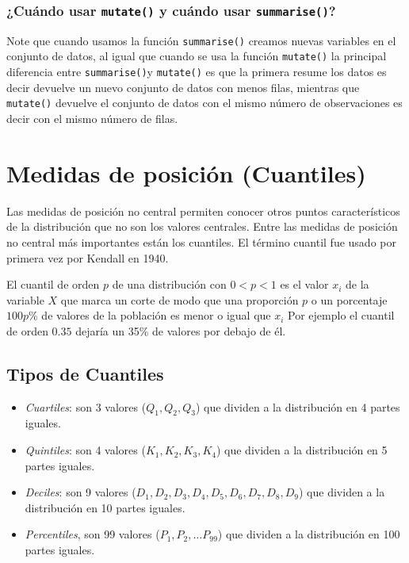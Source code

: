 \documentclass[]{book}
\begin{document}
\hypertarget{cuando-usar-mutate-y-cuando-usar-summarise}{%
\subsubsection{\texorpdfstring{¿Cuándo usar \texttt{mutate()} y cuándo usar \texttt{summarise()}?}{¿Cuándo usar mutate() y cuándo usar summarise()?}}\label{cuando-usar-mutate-y-cuando-usar-summarise}}

Note que cuando usamos la función \texttt{summarise()} creamos nuevas variables en el conjunto de datos, al igual que cuando se usa la función \texttt{mutate()} la principal diferencia entre \texttt{summarise()}y \texttt{mutate()} es que la primera resume los datos es decir devuelve un nuevo conjunto de datos con menos filas, mientras que \texttt{mutate()} devuelve el conjunto de datos con el mismo número de observaciones es decir con el mismo número de filas.

\hypertarget{medidas-de-posicion-cuantiles}{%
\section{Medidas de posición (Cuantiles)}\label{medidas-de-posicion-cuantiles}}

Las medidas de posición no central permiten conocer otros puntos característicos de la distribución que no son los valores centrales. Entre las medidas de posición no central más importantes están los cuantiles. El término cuantil fue usado por primera vez por Kendall en 1940.

El cuantil de orden \(p\) de una distribución con \(0<p<1\) es el valor \(x_{i}\) de la variable \(X\) que marca un corte de modo que una proporción \(p\) o un porcentaje \(100p\)\% de valores de la población es menor o igual que \(x_{i}\) Por ejemplo el cuantil de orden \(0.35\) dejaría un 35\% de valores por debajo de él.

\hypertarget{tipos-de-cuantiles}{%
\subsection{Tipos de Cuantiles}\label{tipos-de-cuantiles}}

\begin{itemize}
\item
  \emph{Cuartiles}: son 3 valores (\(Q_{1}, Q_{2}, Q_{3}\)) que dividen a la distribución en 4 partes iguales.
\item
  \emph{Quintiles}: son 4 valores (\(K_{1}, K_{2}, K_{3}, K_{4}\)) que dividen a la distribución en 5 partes iguales.
\item
  \emph{Deciles}: son 9 valores (\(D_1, D_2, D_3, D_4, D_5, D_6, D_7, D_8, D_9\)) que dividen a la distribución en 10 partes iguales.
\item
  \emph{Percentiles}, son 99 valores (\(P_1, P_2, \ldots P_{99}\)) que dividen a la distribución en 100 partes iguales.
\end{itemize}
\end{document}
